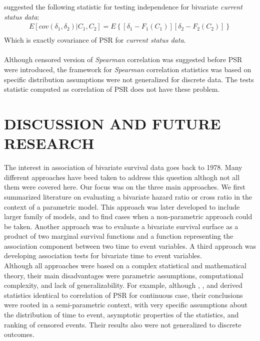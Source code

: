 \documentclass[]{article}
\begin{document}
\cite{ding2004testing} suggested the following statistic for testing independence for bivariate \emph{current status data}:
	$$
	\begin{aligned}
		 E[cov(\delta_1, \delta_2)|C_1,C_2] = E\left\{ [\delta_1 - F_1(C_1)][\delta_2 - F_2(C_2)]  \right\}\\
	\end{aligned}
	$$
Which is exactly covariance of PSR for \emph{current status data}.\\
~\\
Although censored version of \emph{Spearman} correlation was suggested before PSR were introduced, the framework for \emph{Spearman} correlation statistics was based on specific distribution assumptions were not generalized for discrete data. The tests statistic computed as correlation of PSR does not have these problem.

\section{DISCUSSION AND FUTURE RESEARCH}

The interest in association of bivariate survival data goes back to 1978. Many different approaches have beed taken to address this question althogh not all them were covered here. Our focus was on the three main approaches. We first summarized literature on evaluating a bivariate hazard ratio or cross ratio in the context of a parametric model. This approach was later developed to include larger family of models, and to find cases when a non-parametric approach could be taken. Another approach was to evaluate a bivariate survival surface as a product of two marginal survival functions and a function representing the association component between two time to event variables. A third approach was developing association tests for bivariate time to event variables.\\

Although all approaches were based on a complex statistical and mathematical theory, their main disadvantages were parametric assumptions, computational complexity, and lack of generalizability. For example, although \cite{cuzick1982rank}, \cite{dabrowska1988kaplan}, and \cite{ding2004testing} derived statistics identical to correlation of PSR for continuous case, their conclusions were rooted in a semi-parametric context, with very specific assumptions about the distribution of time to event, asymptotic properties of the statistics, and ranking of censored events. Their results also were not generalized to discrete outcomes.\\
\end{document}
